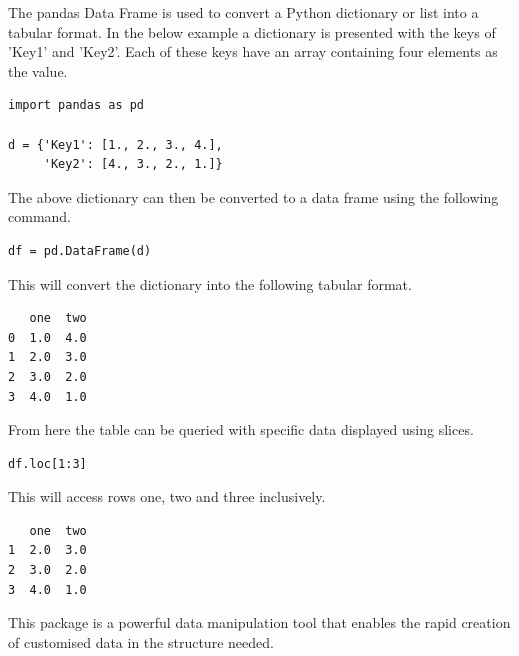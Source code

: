 The pandas Data Frame is used to convert a Python dictionary or list into a tabular format. In the below example a dictionary is presented with the keys of 'Key1' and 'Key2'. Each of these keys have an array containing four elements as the value.~\cite{IntrotoD8:online}
\begin{verbatim}
import pandas as pd

d = {'Key1': [1., 2., 3., 4.],
     'Key2': [4., 3., 2., 1.]}
\end{verbatim}
The above dictionary can then be converted to a data frame using the following command.
\begin{verbatim}
df = pd.DataFrame(d)
\end{verbatim}
This will convert the dictionary into the following tabular format.
\begin{verbatim}
   one  two
0  1.0  4.0
1  2.0  3.0
2  3.0  2.0
3  4.0  1.0
\end{verbatim} 
From here the table can be queried with specific data displayed using slices.
\begin{verbatim}
df.loc[1:3]
\end{verbatim}
This will access rows one, two and three inclusively.
\begin{verbatim}
   one  two
1  2.0  3.0
2  3.0  2.0
3  4.0  1.0
\end{verbatim} 
This package is a powerful data manipulation tool that enables the rapid creation of customised data in the structure needed.

